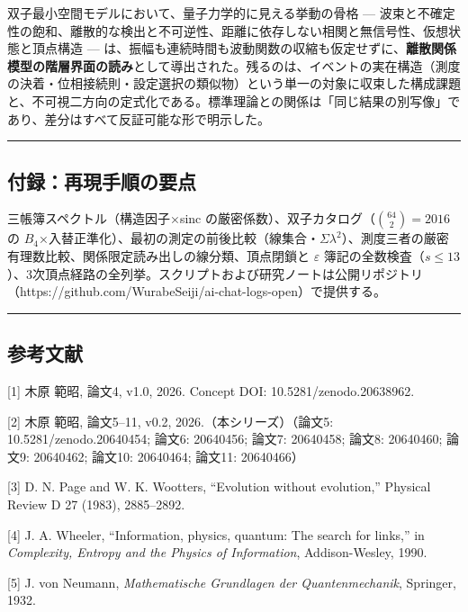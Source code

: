 \documentclass[
]{ltjsarticle}
\begin{document}
双子最小空間モデルにおいて、量子力学的に見える挙動の骨格 ---
波束と不確定性の飽和、離散的な検出と不可逆性、距離に依存しない相関と無信号性、仮想状態と頂点構造
---
は、振幅も連続時間も波動関数の収縮も仮定せずに、\textbf{離散関係模型の階層界面の読み}として導出された。残るのは、イベントの実在構造（測度の決着・位相接続則・設定選択の類似物）という単一の対象に収束した構成課題と、不可視二方向の定式化である。標準理論との関係は「同じ結果の別写像」であり、差分はすべて反証可能な形で明示した。

\begin{center}\rule{0.5\linewidth}{0.5pt}\end{center}

\subsection{付録：再現手順の要点}\label{ux4ed8ux9332ux518dux73feux624bux9806ux306eux8981ux70b9}

三帳簿スペクトル（構造因子×sinc
の厳密係数）、双子カタログ（\(\binom{64}{2}=2016\) の
\(B_4\)×入替正準化）、最初の測定の前後比較（線集合・\(\Sigma\lambda^2\)）、測度三者の厳密有理数比較、関係限定読み出しの線分類、頂点閉鎖と
\(\varepsilon\)
簿記の全数検査（\(s\le13\)）、3次頂点経路の全列挙。スクリプトおよび研究ノートは公開リポジトリ（https://github.com/WurabeSeiji/ai-chat-logs-open）で提供する。

\begin{center}\rule{0.5\linewidth}{0.5pt}\end{center}

\subsection{参考文献}\label{ux53c2ux8003ux6587ux732e}

{[}1{]} 木原 範昭, 論文4, v1.0, 2026. Concept DOI:
10.5281/zenodo.20638962.

{[}2{]} 木原 範昭, 論文5--11, v0.2, 2026.（本シリーズ）（論文5: 10.5281/zenodo.20640454; 論文6: 20640456; 論文7: 20640458; 論文8: 20640460; 論文9: 20640462; 論文10: 20640464; 論文11: 20640466）

{[}3{]} D. N. Page and W. K. Wootters, ``Evolution without evolution,''
Physical Review D 27 (1983), 2885--2892.

{[}4{]} J. A. Wheeler, ``Information, physics, quantum: The search for
links,'' in \emph{Complexity, Entropy and the Physics of Information},
Addison-Wesley, 1990.

{[}5{]} J. von Neumann, \emph{Mathematische Grundlagen der
Quantenmechanik}, Springer, 1932.
\end{document}

